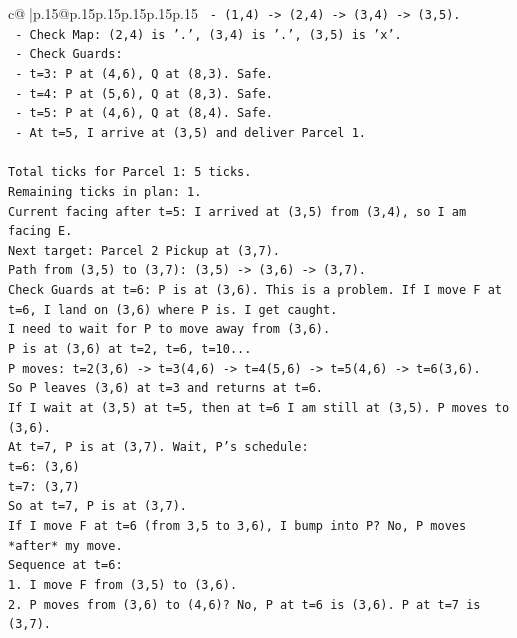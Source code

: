 \documentclass{article}
\begin{document}
{\begin{supertabular}{c@{$\;$}|p{.15\linewidth}@{}p{.15\linewidth}p{.15\linewidth}p{.15\linewidth}p{.15\linewidth}p{.15\linewidth}}
{{{\texttt{   {-} (1,4) {-}> (2,4) {-}> (3,4) {-}> (3,5).} \\
\texttt{   {-} Check Map: (2,4) is '.', (3,4) is '.', (3,5) is 'x'.} \\
\texttt{   {-} Check Guards:} \\
\texttt{     {-} t=3: P at (4,6), Q at (8,3). Safe.} \\
\texttt{     {-} t=4: P at (5,6), Q at (8,3). Safe.} \\
\texttt{     {-} t=5: P at (4,6), Q at (8,4). Safe.} \\
\texttt{   {-} At t=5, I arrive at (3,5) and deliver Parcel 1.} \\
\\ 
\texttt{Total ticks for Parcel 1: 5 ticks.} \\
\texttt{Remaining ticks in plan: 1.} \\
\texttt{Current facing after t=5: I arrived at (3,5) from (3,4), so I am facing E.} \\
\texttt{Next target: Parcel 2 Pickup at (3,7).} \\
\texttt{Path from (3,5) to (3,7): (3,5) {-}> (3,6) {-}> (3,7).} \\
\texttt{Check Guards at t=6: P is at (3,6). This is a problem. If I move F at t=6, I land on (3,6) where P is. I get caught.} \\
\texttt{I need to wait for P to move away from (3,6).} \\
\texttt{P is at (3,6) at t=2, t=6, t=10...} \\
\texttt{P moves: t=2(3,6) {-}> t=3(4,6) {-}> t=4(5,6) {-}> t=5(4,6) {-}> t=6(3,6).} \\
\texttt{So P leaves (3,6) at t=3 and returns at t=6.} \\
\texttt{If I wait at (3,5) at t=5, then at t=6 I am still at (3,5). P moves to (3,6).} \\
\texttt{At t=7, P is at (3,7). Wait, P's schedule:} \\
\texttt{t=6: (3,6)} \\
\texttt{t=7: (3,7)} \\
\texttt{So at t=7, P is at (3,7).} \\
\texttt{If I move F at t=6 (from 3,5 to 3,6), I bump into P? No, P moves *after* my move.} \\
\texttt{Sequence at t=6:} \\
\texttt{1. I move F from (3,5) to (3,6).} \\
\texttt{2. P moves from (3,6) to (4,6)? No, P at t=6 is (3,6). P at t=7 is (3,7).} \\
}}}
\end{supertabular}}
\end{document}
